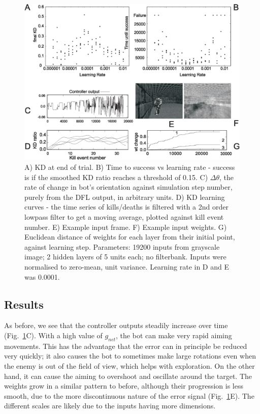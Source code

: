 \documentclass{aamas2018}
\begin{document}
\begin{figure}[!ht]
	\centering \includegraphics[width=\textwidth]{FPSFig4}
	\caption{A) KD at end of trial. B) Time to success vs learning
          rate - success is if the smoothed KD ratio reaches a
          threshold of 0.15. C) $\Delta \theta$, the rate of change in
          bot's orientation against simulation step number, purely
          from the DFL output, in arbitrary units. D) KD learning
          curves - the time series of kills/deaths is filtered with a
          2nd order lowpass filter to get a moving average, plotted
          against kill event number. E) Example input frame. F) Example input weights. G) Euclidean distance of weights
          for each layer from their initial point, against learning
          step. 
          Parameters: 19200 inputs from grayscale image; 2
          hidden layers of 5 units each; no filterbank. Inputs were
          normalised to zero-mean, unit variance. Learning rate in D
          and E was 0.0001.
		\label{shooter_results}}
\end{figure}

\subsection{Results}
As before, we see that the controller outputs steadily increase over
time (Fig.~\ref{shooter_results}C). With a high value of $g_{net}$,
the bot can make very rapid aiming movements. This has the advantage
that the error can in principle be reduced very quickly; it also
causes the bot to sometimes make large rotations even when the enemy
is out of the field of view, which helps with exploration. On the
other hand, it can cause the aiming to overshoot and oscillate around
the target.  The weights grow in a similar pattern to before, although
their progression is less smooth, due to the more discontinuous nature
of the error signal (Fig.~\ref{shooter_results}E). The different
scales are likely due to the inputs having more dimensions.
\end{document}
